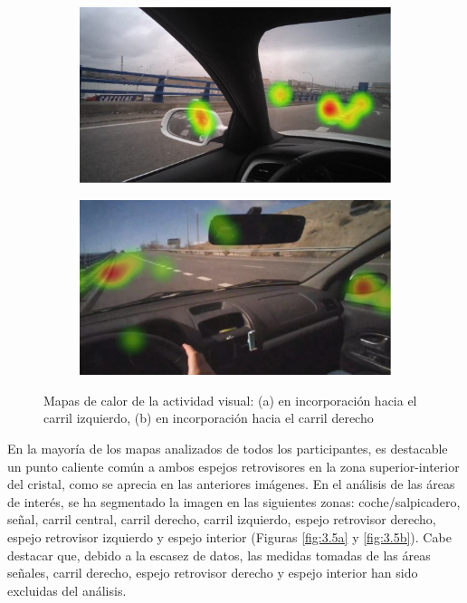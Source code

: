 \begin{figure}[h]
  \centering
  \begin{subfigure}[b]{0.45\textwidth}
    \includegraphics[width=\textwidth]{figures/3.4a.png}
     \caption{}\label{fig:3.4a}
  \end{subfigure}
  \hfill
  \begin{subfigure}[b]{0.45\textwidth}
    \includegraphics[width=\textwidth]{figures/3.4b.png}
     \caption{}\label{fig:3.4b}
  \end{subfigure}
  \caption{Mapas de calor de la actividad visual: (a) en incorporación hacia el carril izquierdo, (b) en incorporación hacia el carril derecho}
  \label{fig:3.4}
\end{figure}

En la mayoría de los mapas analizados de todos los participantes, es destacable un punto caliente común a ambos espejos retrovisores en la zona superior-interior del cristal, como se aprecia en las anteriores imágenes. 
En el análisis de las áreas de interés, se ha segmentado la imagen en las siguientes zonas: coche/salpicadero, señal, carril central, carril derecho, carril izquierdo, espejo retrovisor derecho, espejo retrovisor izquierdo y espejo interior (Figuras \ref{fig:3.5a} y \ref{fig:3.5b}). Cabe destacar que, debido a la escasez de datos, las medidas tomadas de las áreas señales, carril derecho, espejo retrovisor derecho y espejo interior han sido excluidas del análisis. 

